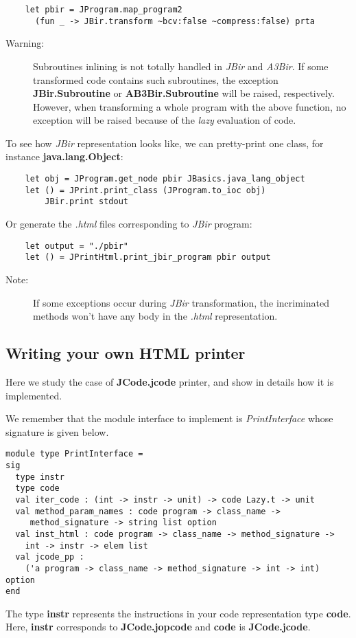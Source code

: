 \documentclass{article}
\begin{document}
\begin{verbatim}
    let pbir = JProgram.map_program2
      (fun _ -> JBir.transform ~bcv:false ~compress:false) prta
\end{verbatim}
\begin{description}
\item[Warning:]
Subroutines inlining is not totally handled in \emph{JBir} and
\emph{A3Bir}. If some transformed code contains such subroutines,
the exception \textbf{JBir.Subroutine} or
\textbf{AB3Bir.Subroutine} will be raised, respectively. However,
when transforming a whole program with the above function, no
exception will be raised because of the \emph{lazy} evaluation of
code.
\end{description}
To see how \emph{JBir} representation looks like, we can
pretty-print one class, for instance \textbf{java.lang.Object}:

\begin{verbatim}
    let obj = JProgram.get_node pbir JBasics.java_lang_object
    let () = JPrint.print_class (JProgram.to_ioc obj)
        JBir.print stdout
\end{verbatim}
Or generate the \emph{.html} files corresponding to \emph{JBir}
program:

\begin{verbatim}
    let output = "./pbir"
    let () = JPrintHtml.print_jbir_program pbir output
\end{verbatim}
\begin{description}
\item[Note:]
If some exceptions occur during \emph{JBir} transformation, the
incriminated methods won't have any body in the \emph{.html}
representation.
\end{description}
\subsection{Writing your own HTML printer}

Here we study the case of \textbf{JCode.jcode} printer, and show in
details how it is implemented.

We remember that the module interface to implement is
\emph{PrintInterface} whose signature is given below.

\begin{verbatim}
module type PrintInterface =
sig
  type instr
  type code
  val iter_code : (int -> instr -> unit) -> code Lazy.t -> unit
  val method_param_names : code program -> class_name ->
     method_signature -> string list option
  val inst_html : code program -> class_name -> method_signature ->
    int -> instr -> elem list
  val jcode_pp :
    ('a program -> class_name -> method_signature -> int -> int) option
end
\end{verbatim}
The type \textbf{instr} represents the instructions in your code
representation type \textbf{code}. Here, \textbf{instr} corresponds
to \textbf{JCode.jopcode} and \textbf{code} is
\textbf{JCode.jcode}.
\end{document}
